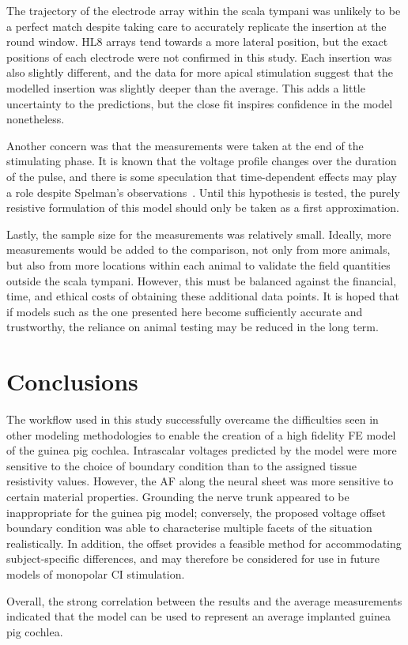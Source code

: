 The trajectory of the electrode array within the scala tympani was unlikely to
be a perfect match despite taking care to accurately replicate the insertion at
the round window. HL8 arrays tend towards a more lateral position, but the exact
\invivo{} positions of each electrode were not confirmed in this study. Each
insertion was also slightly different, and the data for more apical stimulation
suggest that the modelled insertion was slightly deeper than the \invivo{}
average. This adds a little uncertainty to the \insilico{} predictions, but the
close fit inspires confidence in the model nonetheless.

Another concern was that the \invivo{} measurements were taken at the end of the
stimulating phase. It is known that the voltage profile changes over the
duration of the pulse, and there is some speculation that time-dependent effects
may play a role despite Spelman's observations~\cite{spelman1982}. Until this
hypothesis is tested, the purely resistive formulation of this model should only
be taken as a first approximation.

Lastly, the sample size for the \invivo{} measurements was relatively small.
Ideally, more measurements would be added to the comparison, not only from more
animals, but also from more locations within each animal to validate the field
quantities outside the scala tympani. However, this must be balanced against the
financial, time, and ethical costs of obtaining these additional data points. It
is hoped that if \insilico{} models such as the one presented here become
sufficiently accurate and trustworthy, the reliance on animal testing may be
reduced in the long term.

\section{Conclusions}

The workflow used in this study successfully overcame the difficulties seen in
other \insilico{} modeling methodologies to enable the creation of a high
fidelity FE model of the guinea pig cochlea. Intrascalar voltages predicted by
the model were more sensitive to the choice of boundary condition than to the
assigned tissue resistivity values. However, the AF along the neural sheet was
more sensitive to certain material properties. Grounding the nerve trunk
appeared to be inappropriate for the guinea pig model; conversely, the proposed
voltage offset boundary condition was able to characterise multiple facets of
the \invivo{} situation realistically. In addition, the offset provides a
feasible method for accommodating subject-specific differences, and may
therefore be considered for use in future models of monopolar CI stimulation.

Overall, the strong correlation between the \insilico{} results and the average
\invivo{} measurements indicated that the model can be used to represent an
average implanted guinea pig cochlea.
